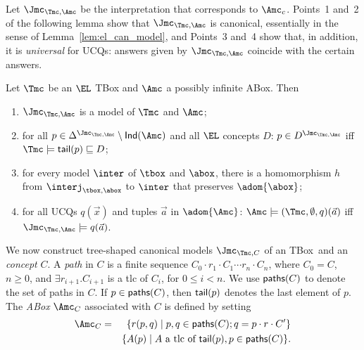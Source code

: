 \documentclass{lmcs}
\theoremstyle{definition}
\begin{document}
%
Let $\Jmc_{\Tmc,\Amc}$
be the interpretation that corresponds to $\Amc_{c}$.
Points~1 and~2 of the following lemma show that $\Jmc_{\Tmc,\Amc}$
is canonical, essentially in the sense of
Lemma~\ref{lem:el_can_model}, and Points~3 and~4 show that, in
addition, it is \emph{universal} for UCQs: answers given by
$\Jmc_{\Tmc,\Amc}$ coincide with the certain answers.
%
%
\begin{lem}\label{aboxcan}
  Let $\Tmc$ be an $\EL$ TBox and $\Amc$ a possibly infinite ABox. Then
  \begin{enumerate}
  \item $\Jmc_{\Tmc,\Amc}$ is a model of $\Tmc$ and $\Amc$;
  \item for all $p\in \Delta^{\Jmc_{\Tmc,\Amc}}\setminus{\sf
      Ind}(\Amc)$ and all $\EL$ concepts $D$: $p\in
    D^{\Jmc_{\Tmc,\Amc}}$ iff \mbox{$\Tmc \models {\sf
        tail}(p)\sqsubseteq D$};
  \item for every model $\inter$ of $\tbox$ and $\abox$, there is a
    homomorphism $h$ from $\interj_{\tbox,\abox}$ to $\inter$ that preserves
         $\adom{\abox}$;
  \item for all UCQs $q(\vec{x})$ and tuples $\vec{a}$ in $\adom{\Amc}$: 
    $\Amc\models (\Tmc,\emptyset,q)(\vec{a})$ iff $\Jmc_{\Tmc,\Amc}\models q(\vec{a})$.
  \end{enumerate}
\end{lem}
%
We now construct tree-shaped canonical models $\Jmc_{\Tmc,C}$
of an \EL TBox~\Tmc and an \EL \emph{concept} $C$.
A \emph{path} in $C$
is a finite sequence $C_{0}\cdot
r_{1}\cdot C_{1}\cdots r_{n}\cdot C_{n}$, where $C_{0}=C$, $n\geq
0$, and $\exists r_{i+1}.C_{i+1}$ is a tlc of $C_{i}$, for $0\leq i
<n$. We use ${\sf paths}(C)$ to denote the set of paths in
$C$.
If $p\in
{\sf paths}(C)$, then ${\sf tail}(p)$ denotes the last element of
$p$.
The \emph{ABox} $\Amc_{C}$ associated with $C$ is defined by setting
%
\begin{eqnarray*}
  \Amc_{C} & = & \{ r(p,q) \mid p,q\in {\sf paths}(C); q = p \cdot r\cdot C'\}\\
  &  &      \{ A(p)\mid A \mbox{ a tlc of } {\sf tail}(p), p \in {\sf paths}(C)\}.
\end{eqnarray*}
\end{document}
